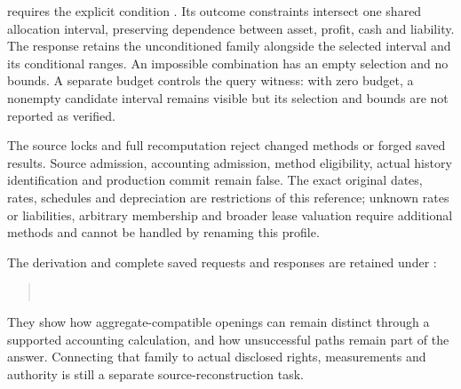  requires the explicit condition
. Its outcome constraints intersect one shared
allocation interval, preserving dependence between asset, profit, cash and
liability. The response retains the unconditioned family alongside the selected
interval and its conditional ranges. An impossible combination has an empty
selection and no bounds. A separate  budget controls the
query witness: with zero budget, a nonempty candidate interval remains visible
but its selection and bounds are not reported as verified.

The source locks and full recomputation reject changed methods or forged saved
results. Source admission, accounting admission, method eligibility, actual
history identification and production commit remain false. The exact original
dates, rates, schedules and depreciation are restrictions of this reference;
unknown rates or liabilities, arbitrary membership and broader lease valuation
require additional methods and cannot be handled by renaming this profile.

The derivation and complete saved requests and responses are retained under
:
\begin{quote}\small
{}\\
\end{quote}
They show how aggregate-compatible openings can remain distinct through a
supported accounting calculation, and how unsuccessful paths remain part of
the answer. Connecting that family to actual disclosed rights, measurements
and authority is still a separate source-reconstruction task.
